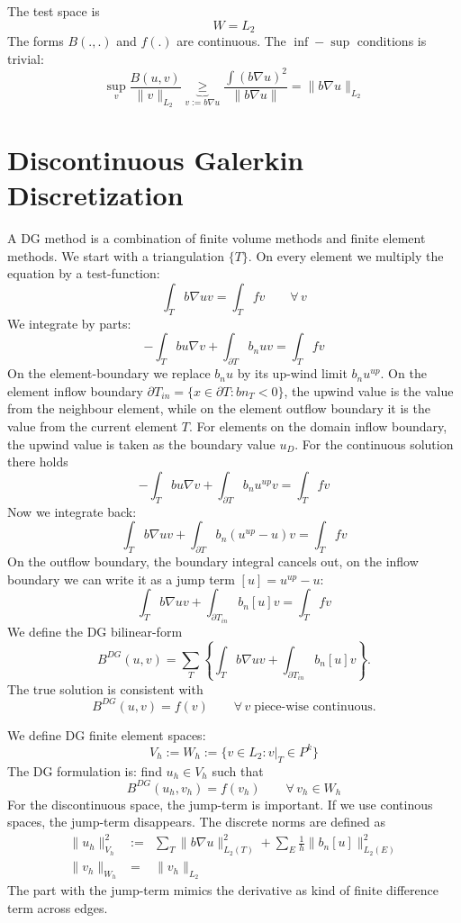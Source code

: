 The test space is
$$
W  = L_2
$$
The forms $B(.,.)$ and $f(.)$ are continuous. The $\inf-\sup$
conditions is trivial:
$$
\sup_v \frac{B(u,v)} { \| v \|_{L_2}} \underbrace{ \geq }_{v := b
 \nabla u} \frac { \int (b \nabla u)^2 } { \| b \nabla u
  \| } = \| b \nabla u\|_{L_2}
$$


\section{Discontinuous Galerkin Discretization}
A DG method is a combination of finite volume methods and
finite element methods.
We start with a triangulation $\{ T \}$. On every element we multiply
the equation by a test-function:
$$
\int_T b \nabla u v = \int_T f v  \qquad \forall \, v
$$
We integrate by parts:
$$
-\int_T b u \nabla v + \int_{\partial T} b_n u v = \int_T f v  
$$ 
On the element-boundary we replace $b_n u$ by its up-wind limit $b_n
u^{up}$. On the element inflow boundary $\partial T_{in} = \{ x \in \partial T
: b n_T < 0 \}$, the upwind value is the value from the neighbour
element, while on the element outflow boundary it is the value from
the current element $T$. For elements on the domain inflow boundary,
the upwind value is taken as the boundary value $u_D$.
For the continuous solution there holds
$$
-\int_T b u \nabla v + \int_{\partial T} b_n u^{up} v = \int_T f v 
$$ 
Now we integrate back:
$$
\int_T b \nabla u v + \int_{\partial T} b_n (u^{up}-u) v = \int_T f v 
$$ 
On the outflow boundary, the boundary integral cancels out, on the
inflow boundary we can write it as a jump term $[u] = u^{up} - u$:
$$
\int_T b \nabla u v + \int_{\partial T_{in}} b_n [u] v = \int_T f v 
$$
We define the DG bilinear-form
$$
B^{DG} (u,v) = \sum_T \left\{ \int_T b \nabla u v + \int_{\partial
  T_{in}} b_n 
[u] v \right\}.
$$
The true solution is consistent with 
$$
B^{DG} (u,v) = f(v)  \qquad \forall \, v \; \text{piece-wise continuous}.
$$

We define DG finite element spaces:
$$
V_h := W_h := \{ v \in L_2 : v |_T \in P^k \} 
$$
The DG formulation is: find $u_h \in V_h$ such that
$$
B^{DG} (u_h, v_h) = f(v_h)  \qquad \forall \, v_h \in W_h
$$
For the discontinuous space, the jump-term is important. If we use 
continous spaces, the jump-term disappears.
The discrete norms are defined as 
\begin{eqnarray*}
\| u_h \|_{V_h}^2 & := & \sum_T \| b \nabla u \|_{L_2(T)}^2 +
  \sum_E \tfrac{1}{h} \| b_n [u] \|_{L_2(E)}^2  \\
\| v_h \|_{W_h} & = & \| v_h \|_{L_2}
\end{eqnarray*}
The part with the jump-term mimics the derivative as kind of finite
difference term across edges.


